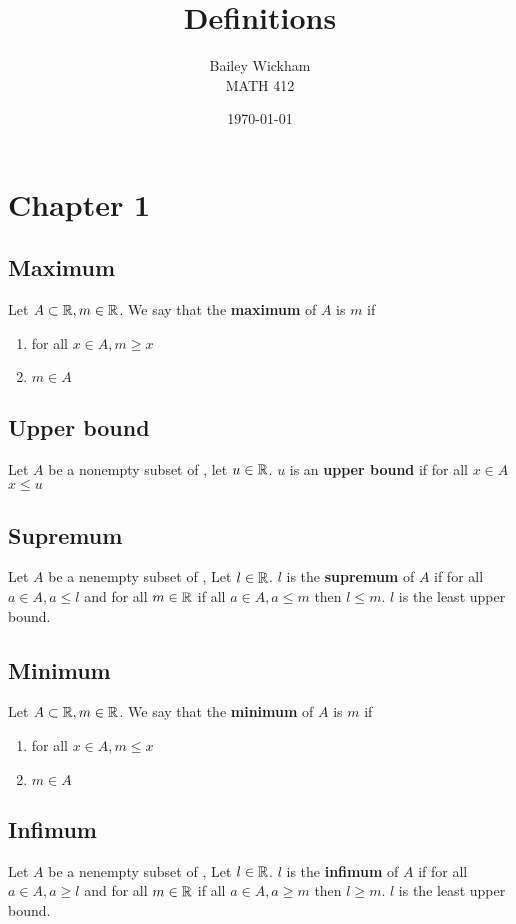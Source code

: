 \documentclass{article}
\title{Definitions}
\author{Bailey Wickham \\ MATH 412}
\date\today
\begin{document}
\maketitle

\section{Chapter 1}
\subsection{Maximum}
Let $A \subset \protect\mathbb{R}, m \in \protect\mathbb{R}$. We say that the \textbf{maximum} of $A$ is $m$ if
\begin{enumerate}
    \item for all $x \in A, m \ge x$
    \item $m \in A$
\end{enumerate}

\subsection{Upper bound}
Let $A$ be a nonempty subset of \bR, let $u \in \protect\mathbb{R}$. $u$ is an \textbf{upper bound} if for all $x\in A$ $x \le u$

\subsection{Supremum}
Let $A$ be a nenempty subset of \bR, Let $l \in \protect\mathbb{R}$. $l$ is the \textbf{supremum} of $A$ if for all $a \in A, a \le l$ and for all $m \in \protect\mathbb{R}$ if all $a \in A, a \le m$ then $l\le m$. $l$ is the least upper bound.

\subsection{Minimum}
Let $A \subset \protect\mathbb{R}, m \in \protect\mathbb{R}$. We say that the \textbf{minimum} of $A$ is $m$ if
\begin{enumerate}
    \item for all $x \in A, m \le x$
    \item $m \in A$
\end{enumerate}

\subsection{Infimum}
Let $A$ be a nenempty subset of \bR, Let $l \in \protect\mathbb{R}$. $l$ is the \textbf{infimum} of $A$ if for all $a \in A, a \ge l$ and for all $m \in \protect\mathbb{R}$ if all $a \in A, a \ge m$ then $l\ge m$. $l$ is the least upper bound.
\end{document}
